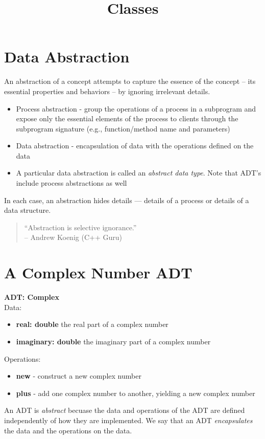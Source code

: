 \documentclass{article}
\title{Classes}
\date{}
\begin{document}
\maketitle

\section{Data Abstraction}


An abstraction of a concept attempts to capture the essence of the concept -- its essential properties and behaviors -- by ignoring irrelevant details.
\begin{itemize}
\item Process abstraction - group the operations of a process in a subprogram and expose only the essential elements of the process to clients through the subprogram signature (e.g., function/method name and parameters)
\item Data abstraction - encapsulation of data with the operations defined on the data
\item A particular data abstraction is called an {\em abstract data type}.  Note that ADT's include process abstractions as well
\end{itemize}

In each case, an abstraction hides details --- details of a process or details of a data structure.

\begin{quote}
``Abstraction is selective ignorance.''\\
-- Andrew Koenig (C++ Guru)
\end{quote}


\section{A Complex Number ADT}


{\bf ADT: Complex}\\
Data:
\begin{itemize}
\item {\bf real: double} the real part of a complex number
\item {\bf imaginary: double} the imaginary part of a complex number
\end{itemize}
Operations:
\begin{itemize}
\item {\bf new} - construct a new complex number
\item {\bf plus} - add one complex number to another, yielding a new complex number
\end{itemize}
An ADT is {\it abstract} becuase the data and operations of the ADT are defined independently of how they are implemented.  We say that an ADT {\it encapsulates} the data and the operations on the data.
\end{document}
